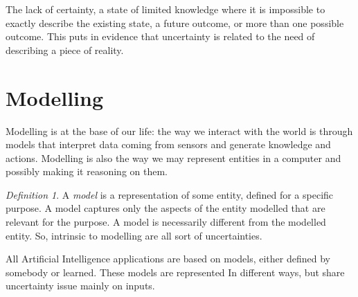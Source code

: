 \documentclass[12pt, a4paper]{report}
\theoremstyle{remark}
\newtheorem*{remark}{Definition}
\begin{document}
    The lack of certainty, a state of limited knowledge where it is impossible to exactly describe the existing state, a future outcome,
    or more than one possible outcome. This puts in evidence that uncertainty is related to the need of describing a piece of reality.

    \section{Modelling}
    Modelling is at the base of our life: the way we interact with the world is through models that interpret data coming from sensors
    and generate knowledge and actions. Modelling is also the way we may represent entities in a computer and possibly making it reasoning
    on them.
    \begin{remark}
        A \emph{model} is a representation of some entity, defined for a specific purpose. A model captures only the aspects of the entity
        modelled that are relevant for the purpose. A model is necessarily different from the modelled entity. So, intrinsic to modelling
        are all sort of uncertainties.
    \end{remark}
    All Artificial Intelligence applications are based on models, either defined by somebody or learned. These models are represented In
    different ways, but share uncertainty issue mainly on inputs. 
\end{document}
